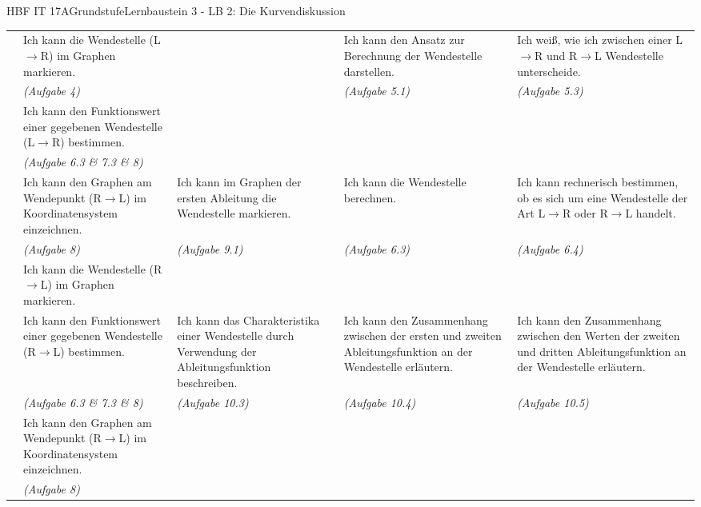 \documentclass[oneside,openany,headings=optiontotoc,12pt,numbers=noenddot]{scrreprt}
\begin{document}
\begin{worksheet}{HBF IT 17A}{Grundstufe}{Lernbaustein 3 - LB 2: Die Kurvendiskussion}
\begin{framed}
\begin{tabularx}{\textwidth}{l|X|X|X|X|}
				& Ich kann die Wendestelle (L\(\rightarrow\)R) im Graphen markieren. & & Ich kann den Ansatz zur Berechnung der Wendestelle darstellen. & Ich weiß, wie ich zwischen einer L\(\rightarrow\)R und R\(\rightarrow\)L Wendestelle unterscheide.\\
				& \textit{(Aufgabe 4)} & & \textit{(Aufgabe 5.1)} & \textit{(Aufgabe 5.3)}\\
				\cline{2-2}
				\multirow{2}{*}{\tabrotate{Wendestelle L\(\rightarrow\)R}}
				& Ich kann den Funktionswert einer gegebenen Wendestelle (L\(\rightarrow\)R) bestimmen. & & &\\
				& \textit{(Aufgabe 6.3 \& 7.3 \& 8)} & & &\\
				\cline{2-5}
				& Ich kann den Graphen am Wendepunkt (R\(\rightarrow\)L) im Koordinatensystem einzeichnen. & Ich kann im Graphen der ersten Ableitung die Wendestelle markieren. & Ich kann die Wendestelle berechnen. & Ich kann rechnerisch bestimmen, ob es sich um eine Wendestelle der Art L\(\rightarrow\)R oder R\(\rightarrow\)L handelt.\\
				& \textit{(Aufgabe 8)} & \textit{(Aufgabe 9.1)} & \textit{(Aufgabe 6.3)} & \textit{(Aufgabe 6.4)}\\
				\hhline{=|=|~|~|~|}
				& Ich kann die Wendestelle (R\(\rightarrow\)L) im Graphen markieren. & & & \\
				\cline{2-5}
				\multirow{2}{*}{\tabrotate{Wendestelle R\(\rightarrow\)L}}
				& Ich kann den Funktionswert einer gegebenen Wendestelle (R\(\rightarrow\)L) bestimmen. & Ich kann das Charakteristika einer Wendestelle durch Verwendung der Ableitungsfunktion beschreiben. & Ich kann den Zusammenhang zwischen der ersten und zweiten Ableitungsfunktion an der Wendestelle erläutern. & Ich kann den Zusammenhang zwischen den Werten der zweiten und dritten Ableitungsfunktion an der Wendestelle erläutern.\\
				& \textit{(Aufgabe 6.3 \& 7.3 \& 8)} & \textit{(Aufgabe 10.3)} & \textit{(Aufgabe 10.4)} & \textit{(Aufgabe 10.5)}\\
				\cline{2-2}
				& Ich kann den Graphen am Wendepunkt (R\(\rightarrow\)L) im Koordinatensystem einzeichnen. & & &\\
				& \textit{(Aufgabe 8)} & & &\\
				\cline{2-5}
			\end{tabularx}
		\end{framed}
	\end{worksheet}
\end{document}

